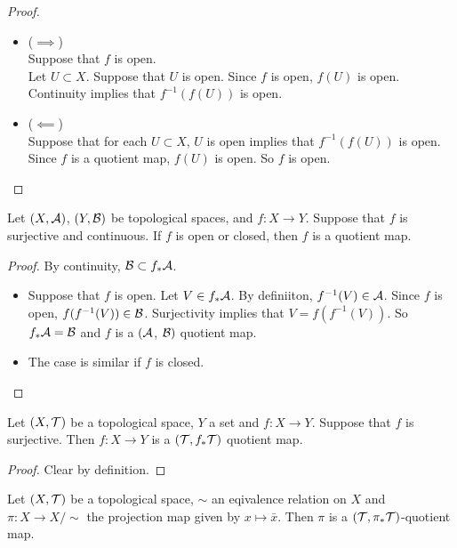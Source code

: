 \documentclass{book}
\begin{document}
	\begin{proof}\
	\begin{itemize}	
	\item ($\implies$) \\
	Suppose that $f$ is open.\\
	Let $U \subset X$. Suppose that $U$ is open. Since $f$ is open, $f(U)$ is open. Continuity implies that $f^{-1}(f(U))$ is open.\\ 
	\item ($\impliedby$) \\
	Suppose that for each $U \subset X$, $U$ is open implies that $f^{-1}(f(U))$ is open. \\
	Since $f$ is a quotient map, $f(U)$ is open. So $f$ is open.
	
	\end{itemize}
	\end{proof}
	
	\begin{ex} 
	Let $(X, \mathcal{A})$, $(Y, \mathcal{B})$ be topological spaces, and $f:X \rightarrow Y$. Suppose that $f$ is surjective and continuous. If $f$ is open or closed, then $f$ is a quotient map.
	\end{ex}
	
	\begin{proof}
	By continuity, $\mathcal{B} \subset f_*\mathcal{A}$. 
	\begin{itemize}
	\item Suppose that $f$ is open. Let $V \in f_*\mathcal{A}$. By definiiton, $f^{-1}(V) \in \mathcal{A}$. Since $f$ is open, $f(f^{-1}(V)) \in \mathcal{B}$. Surjectivity implies that $V = f(f^{-1}(V))$. So $f_*\mathcal{A} = \mathcal{B}$ and $f$ is a $(\mathcal{A}$, $\mathcal{B})$ quotient map.
	\item The case is similar if $f$ is closed.
	\end{itemize}
	\end{proof}
	
	\begin{ex} 
	Let $(X, \mathcal{T})$ be a topological space, $Y$ a set and $f:X \rightarrow Y$. Suppose that $f$ is surjective. Then $f: X \rightarrow Y$ is a $(\mathcal{T}, f_*\mathcal{T})$ quotient map. 
	\end{ex}
	
	\begin{proof}
	Clear by definition.
	\end{proof}
	
	
	\begin{ex} 
	Let $(X, \mathcal{T})$ be a topological space, $\sim$ an eqivalence relation on $X$ and $\pi:X \rightarrow X/\sim$ the projection map given by $x \mapsto \bar{x}$. Then $\pi$ is a $(\mathcal{T}, \pi_*\mathcal{T})$-quotient map. 
	\end{ex}
	
\end{document}
